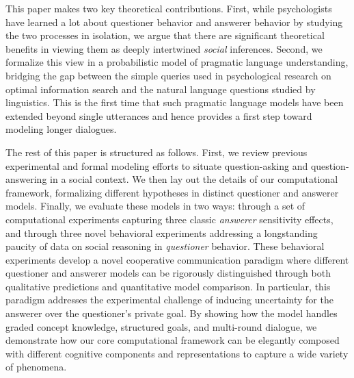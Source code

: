 \documentclass[12pt, floatsintext, jou]{apa6}
\begin{document}
This paper makes two key theoretical contributions. First, while psychologists have learned a lot about questioner behavior and answerer behavior by studying the two processes in isolation, we argue that there are significant theoretical benefits in viewing them as deeply intertwined \emph{social} inferences. Second, we formalize this view in a probabilistic model of pragmatic language understanding, bridging the gap between the simple queries used in psychological research on optimal information search and the natural language questions studied by linguistics. 
This is the first time that such pragmatic language models have been extended beyond single utterances and hence provides a first step toward modeling longer dialogues.
%

The rest of this paper is structured as follows. 
First, we review previous experimental and formal modeling efforts to situate question-asking and question-answering in a social context. 
We then lay out the details of our computational framework, formalizing different hypotheses in distinct questioner and answerer models. 
Finally, we evaluate these models in two ways: through a set of computational experiments capturing three classic \emph{answerer} sensitivity effects, and through three novel behavioral experiments addressing a longstanding paucity of data on social reasoning in \emph{questioner} behavior. 
These behavioral experiments develop a novel cooperative communication paradigm where different questioner and answerer models can be rigorously distinguished through both qualitative predictions and quantitative model comparison. 
In particular, this paradigm addresses the experimental challenge of inducing uncertainty for the answerer over the questioner's private goal.
By showing how the model handles graded concept knowledge, structured goals, and multi-round dialogue, we demonstrate how our core computational framework can be elegantly composed with different cognitive components and representations to capture a wide variety of phenomena.

\end{document}
